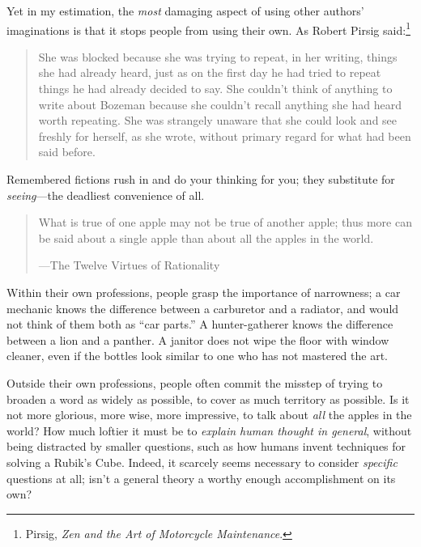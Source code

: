 {
 Yet in my estimation, the \textit{most} damaging aspect of using
other authors' imaginations is that it stops people
from using their own. As Robert Pirsig said:\footnote{Pirsig, \textit{Zen and the Art of Motorcycle Maintenance}.}}

\begin{quote}
{
 She was blocked because she was trying to repeat, in her writing,
things she had already heard, just as on the first day he had tried to
repeat things he had already decided to say. She
couldn't think of anything to write about Bozeman
because she couldn't recall anything she had heard
worth repeating. She was strangely unaware that she could look and see
freshly for herself, as she wrote, without primary regard for what had
been said before.}
\end{quote}

{
 Remembered fictions rush in and do your thinking for you; they
substitute for \textit{seeing}{}---the deadliest convenience of all.}

\myendsectiontext


\bigskip


\begin{quote}
{
 What is true of one apple may not be true of another apple; thus
more can be said about a single apple than about all the apples in the
world.}

{\raggedleft
 {}---The Twelve Virtues of Rationality
\par}
\end{quote}

{
 Within their own professions, people grasp the importance of
narrowness; a car mechanic knows the difference between a carburetor
and a radiator, and would not think of them both as
``car parts.'' A hunter-gatherer
knows the difference between a lion and a panther. A janitor does not
wipe the floor with window cleaner, even if the bottles look similar to
one who has not mastered the art.}

{
 Outside their own professions, people often commit the misstep of
trying to broaden a word as widely as possible, to cover as much
territory as possible. Is it not more glorious, more wise, more
impressive, to talk about \textit{all} the apples in the world? How
much loftier it must be to \textit{explain human thought in general},
without being distracted by smaller questions, such as how humans
invent techniques for solving a Rubik's Cube. Indeed,
it scarcely seems necessary to consider \textit{specific} questions at
all; isn't a general theory a worthy enough
accomplishment on its own?}

